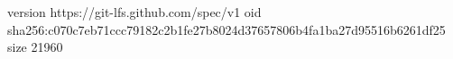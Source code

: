 version https://git-lfs.github.com/spec/v1
oid sha256:c070c7eb71ccc79182c2b1fe27b8024d37657806b4fa1ba27d95516b6261df25
size 21960
